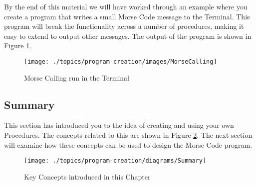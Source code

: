 By the end of this material we will have worked through an example where you create a program that writes a small Morse Code message to the Terminal. This program will break the functionality across a number of procedures, making it easy to extend to output other messages. The output of the program is shown in Figure \ref{fig:procedure-decl-morse_calling}.

\begin{figure}[h]
   \centering
   \texttt{[image: ./topics/program-creation/images/MorseCalling]} 
   \caption{Morse Calling run in the Terminal}
   \label{fig:procedure-decl-morse_calling}
\end{figure}





\clearpage
\subsection{Summary} %
\label{sub:procedure-decl_summary}

This section has introduced you to the idea of creating and using your own Procedures. The concepts related to this are shown in Figure \ref{fig:procedure-decl-summary}. The next section will examine how these concepts can be used to design the Morse Code program.

\begin{figure}[h]
   \centering
   \texttt{[image: ./topics/program-creation/diagrams/Summary]} 
   \caption[Chapter Concepts]{Key Concepts introduced in this Chapter}
   \label{fig:procedure-decl-summary}
\end{figure}






